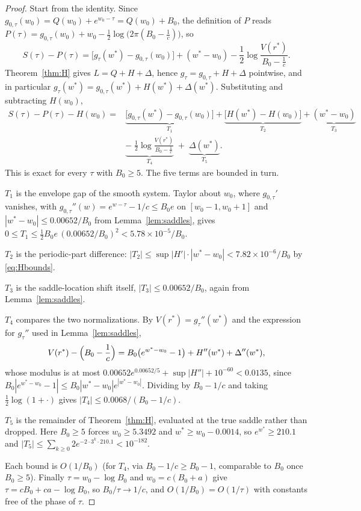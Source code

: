 \documentclass[11pt]{amsart}
\theoremstyle{plain}
\theoremstyle{definition}
\theoremstyle{remark}
\begin{document}
\begin{proof}
Start from the identity. Since $g_{0,\tau}(w_0) = Q(w_0)+e^{w_0-\tau} = Q(w_0)+B_0$, the definition
of $P$ reads $P(\tau) = g_{0,\tau}(w_0)+w_0-\tfrac12\log\bigl(2\pi(B_0-\tfrac1c)\bigr)$, so
\[
S(\tau)-P(\tau) = \bigl[g_\tau(w^*)-g_{0,\tau}(w_0)\bigr]+(w^*-w_0)
-\frac12\log\frac{V(r^*)}{B_0-\tfrac1c}.
\]
Theorem~\ref{thm:H} gives $L = Q+H+\Delta$, hence $g_\tau = g_{0,\tau}+H+\Delta$ pointwise, and in
particular $g_\tau(w^*) = g_{0,\tau}(w^*)+H(w^*)+\Delta(w^*)$. Substituting and subtracting
$H(w_0)$,
\begin{equation}
\label{eq:envfive}
\begin{split}
S(\tau)-P(\tau)-H(w_0) = {}& \underbrace{\bigl[g_{0,\tau}(w^*)-g_{0,\tau}(w_0)\bigr]}_{T_1}
+\underbrace{\bigl[H(w^*)-H(w_0)\bigr]}_{T_2}
+\underbrace{(w^*-w_0)}_{T_3} \\[2pt]
&{}\underbrace{-\;\frac12\log\frac{V(r^*)}{B_0-\tfrac1c}}_{T_4}
\;+\;\underbrace{\Delta(w^*)}_{T_5}.
\end{split}
\end{equation}
This is exact for every $\tau$ with $B_0\ge5$. The five terms are bounded in turn.

$T_1$ is the envelope gap of the smooth system. Taylor about $w_0$, where $g_{0,\tau}'$ vanishes,
with $g_{0,\tau}''(w) = e^{w-\tau}-1/c \le B_0e$ on $[w_0-1,w_0+1]$ and $|w^*-w_0| \le 0.00652/B_0$
from Lemma~\ref{lem:saddles}, gives $0\le T_1 \le \tfrac12 B_0e\,(0.00652/B_0)^2 <
5.78\times10^{-5}/B_0$.

$T_2$ is the periodic-part difference: $|T_2| \le \sup|H'|\cdot|w^*-w_0| < 7.82\times10^{-6}/B_0$ by
\eqref{eq:Hbounds}.

$T_3$ is the saddle-location shift itself, $|T_3| \le 0.00652/B_0$, again from
Lemma~\ref{lem:saddles}.

$T_4$ compares the two normalizations. By $V(r^*) = g_\tau''(w^*)$ and the expression for
$g_\tau''$ used in Lemma~\ref{lem:saddles},
\[
V(r^*)-\Bigl(B_0-\frac1c\Bigr) = B_0\bigl(e^{w^*-w_0}-1\bigr)+H''(w^*)+\Delta''(w^*),
\]
whose modulus is at most $0.00652e^{0.00652/5}+\sup|H''|+10^{-60} < 0.0135$, since
$B_0|e^{w^*-w_0}-1| \le B_0|w^*-w_0|e^{|w^*-w_0|}$. Dividing by $B_0-1/c$ and taking
$\tfrac12\log(1+\cdot)$ gives $|T_4| \le 0.0068/(B_0-1/c)$.

$T_5$ is the remainder of Theorem~\ref{thm:H}, evaluated at the true saddle rather than dropped.
Here $B_0\ge5$ forces $w_0\ge5.3492$ and $w^*\ge w_0-0.0014$, so $e^{w^*}\ge210.1$ and
$|T_5| \le \sum_{k\ge0}2e^{-2\cdot3^k\cdot210.1} < 10^{-182}$.

Each bound is $O(1/B_0)$ (for $T_4$, via $B_0-1/c\ge B_0-1$, comparable to $B_0$ once $B_0\ge5$).
Finally $\tau = w_0-\log B_0$ and
$w_0 = c(B_0+a)$ give $\tau = cB_0+ca-\log B_0$, so $B_0/\tau \to 1/c$, and $O(1/B_0) = O(1/\tau)$
with constants free of the phase of $\tau$.
\end{proof}
\end{document}
